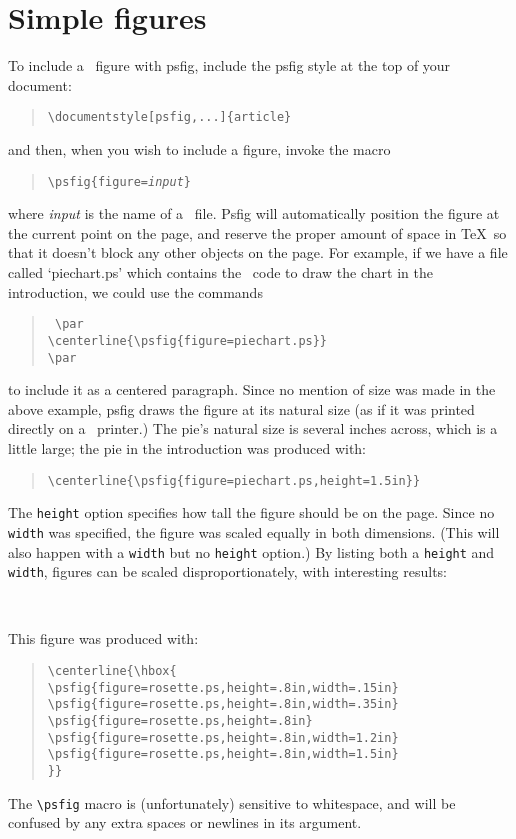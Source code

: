 \section{Simple figures}
To include a \Ps\ figure with psfig, include the psfig style at the top
of your document:
\begin{quote}
{\tt\verb+\documentstyle[psfig,...]{article}+}
\end{quote}
and then, when you wish to include a figure, invoke the macro
\begin{quote}
{\tt\verb+\+psfig\{figure={\it input}\}}
\end{quote}
where {\it input} is the name of a \Ps\ file.  Psfig will
automatically position the figure at the current point on the page,
and reserve the proper amount of space in \TeX\ so that it doesn't
block any other objects on the page.  For example, if we have a file
called `piechart.ps' which contains the \Ps\ code to draw the chart in
the introduction, we could use the commands
\begin{quote}
\tt
\verb+\+par \\
\verb+\+centerline\{\verb+\+psfig\{figure=piechart.ps\}\} \\
\verb+\+par
\end{quote}
to include it as a centered paragraph.
Since no mention of size was made in the above example, psfig draws the figure 
at its natural size (as if it was printed directly on 
a \Ps\ printer.) The pie's natural size is several inches across, which
is a little large; the pie in the introduction was produced with:
\begin{quote}
\tt\verb+\+centerline\{\verb+\+psfig\{figure=piechart.ps,height=1.5in\}\}
\end{quote}
The {\tt height} option specifies how tall the figure should be on the
page. Since no {\tt width} was specified, the figure was scaled
equally in both dimensions. (This will also happen with a {\tt width}
but no {\tt height} option.)  By listing both a {\tt height} and {\tt
width}, figures can be scaled disproportionately, with interesting
results:
\par
\centerline{\hbox{
}}
\par
\noindent This figure was produced with:
\begin{quote}
\tt\verb+\+centerline\{\verb+\+hbox\{ \\
\verb+\+psfig\{figure=rosette.ps,height=.8in,width=.15in\}\\
\verb+\+psfig\{figure=rosette.ps,height=.8in,width=.35in\}\\
\verb+\+psfig\{figure=rosette.ps,height=.8in\} \\
\verb+\+psfig\{figure=rosette.ps,height=.8in,width=1.2in\}\\
\verb+\+psfig\{figure=rosette.ps,height=.8in,width=1.5in\}\\
\}\} 
\end{quote}
The \verb+\psfig+ macro is (unfortunately) sensitive to whitespace, and will be
confused by any extra spaces or newlines in its argument.
